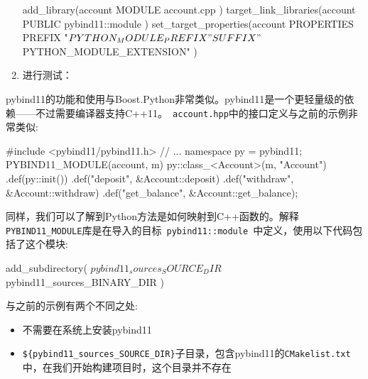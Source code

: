 \begin{enumerate}
\begin{codebox}[cmake]
add_library(account
  MODULE
    account.cpp
  )
target_link_libraries(account
  PUBLIC
    pybind11::module
  )
set_target_properties(account
  PROPERTIES
    PREFIX "${PYTHON_MODULE_PREFIX}"
    SUFFIX "${PYTHON_MODULE_EXTENSION}"
  )
\end{codebox}

\item 进行测试：


\end{enumerate}


pybind11的功能和使用与Boost.Python非常类似。pybind11是一个更轻量级的依赖——不过需要编译器支持C++11。\texttt{ account.hpp}中的接口定义与之前的示例非常类似:

\begin{codebox}[cpp]
#include <pybind11/pybind11.h>
// ...
namespace py = pybind11;
PYBIND11_MODULE(account, m)
{
  py::class_<Account>(m, "Account")
      .def(py::init())
      .def("deposit", &Account::deposit)
      .def("withdraw", &Account::withdraw)
      .def("get_balance", &Account::get_balance);
}
\end{codebox}

同样，我们可以了解到Python方法是如何映射到C++函数的。解释\texttt{PYBIND11\_MODULE}库是在导入的目标\texttt{ pybind11::module }中定义，使用以下代码包括了这个模块:

\begin{codebox}[cmake]
add_subdirectory(
  ${pybind11_sources_SOURCE_DIR}
  ${pybind11_sources_BINARY_DIR}
  )
\end{codebox}

与之前的示例有两个不同之处:

\begin{itemize}
\item 不需要在系统上安装pybind11

\item \texttt{\$\{pybind11\_sources\_SOURCE\_DIR\}}子目录，包含pybind11的\texttt{CMakelist.txt}中，在我们开始构建项目时，这个目录并不存在

\end{itemize}

